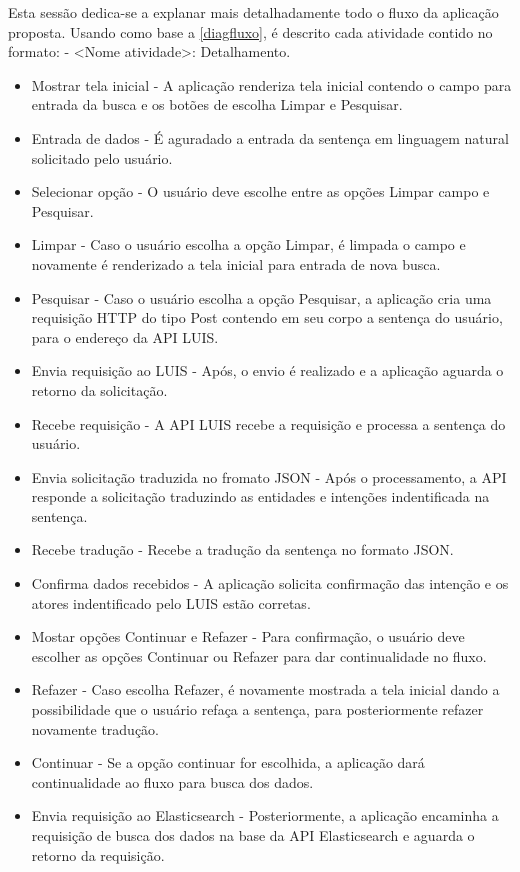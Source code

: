 Esta sessão dedica-se a explanar mais detalhadamente todo o fluxo da aplicação proposta. Usando como base a \autoref{diagfluxo}, é descrito cada atividade contido no formato: - <Nome atividade>: Detalhamento.

\clearpage
\begin{itemize}
	\item Mostrar tela inicial - A aplicação renderiza tela inicial contendo o campo para entrada da busca e os botões de escolha Limpar e Pesquisar.
	\item Entrada de dados - É aguradado a entrada da sentença em linguagem natural solicitado pelo usuário.
	\item Selecionar opção - O usuário deve escolhe entre as opções Limpar campo e Pesquisar.
	\item Limpar - Caso o usuário escolha a opção Limpar, é limpada o campo e novamente é renderizado a tela inicial para entrada de nova busca.
	\item Pesquisar - Caso o usuário escolha a opção Pesquisar, a aplicação cria uma requisição HTTP do tipo Post contendo em seu corpo a sentença do usuário, para o endereço da API LUIS.
	\item Envia requisição ao LUIS - Após, o envio é realizado e a aplicação aguarda o retorno da solicitação.
	\item Recebe requisição - A API LUIS recebe a requisição e processa a sentença do usuário.
	\item Envia solicitação traduzida no fromato JSON - Após o processamento, a API responde a solicitação traduzindo as entidades e intenções indentificada na sentença.
	\item Recebe tradução - Recebe a tradução da sentença no formato JSON.
	\item Confirma dados recebidos - A aplicação solicita confirmação das intenção e os atores indentificado pelo LUIS estão corretas.
	\item Mostar opções Continuar e Refazer - Para confirmação, o usuário deve escolher as opções Continuar ou Refazer para dar continualidade no fluxo.
	\item Refazer - Caso escolha Refazer, é novamente mostrada a tela inicial dando a possibilidade que o usuário refaça a sentença, para posteriormente refazer novamente tradução.
	\item Continuar - Se a opção continuar for escolhida, a aplicação dará continualidade ao fluxo para busca dos dados.
	\item Envia requisição ao Elasticsearch - Posteriormente, a aplicação encaminha a requisição  de busca dos dados na base da API Elasticsearch e aguarda o retorno da requisição.

\end{itemize}
